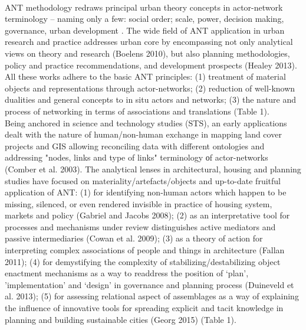 \documentclass[11pt]{report}
\begin{document}
\\
ANT methodology redraws principal urban theory concepts in actor-network terminology – naming only a few: social order; scale, power, decision making, governance, urban development . The wide field of ANT application in urban research and practice addresses urban core by encompassing not only analytical views on theory and research (Boelens 2010), but also planning methodologies, policy and practice recommendations, and development prospects (Healey 2013). All these works adhere to the basic ANT principles: (1) treatment of material objects and representations through actor-networks; (2) reduction of well-known dualities and general concepts to in situ actors and networks; (3) the nature and process of networking in terms of associations and translations (Table 1).
\\
Being anchored in science and technology studies (STS), an early applications dealt with the nature of human/non-human exchange in mapping land cover projects and GIS allowing reconciling data with different ontologies and addressing "nodes, links and type of links" terminology оf actor-networks (Comber et al. 2003). The analytical lenses in architectural, housing and planning studies have focused on materiality/artefacts/objects and up-to-date fruitful application of ANT: (1) for identifying non-human actors which happen to be missing, silenced, or even rendered invisible in practice of housing system, markets and policy (Gabriel and Jacobs 2008); (2) as an interpretative tool for processes and mechanisms under review distinguishes active mediators and passive intermediaries (Cowan et al. 2009); (3) as a theory of action for interpreting complex associations of people and things in architecture (Fallan 2011); (4) for demystifying the complexity of stabilizing/destabilizing object enactment mechanisms as a way to readdress the position of ‘plan’, ’implementation’ and ‘design’ in governance and planning process (Duineveld et al. 2013); (5) for assessing relational aspect of assemblages as a way of explaining the influence of innovative tools for spreading explicit and tacit knowledge in planning and building sustainable cities (Georg 2015) (Table 1).
\\
\end{document}
